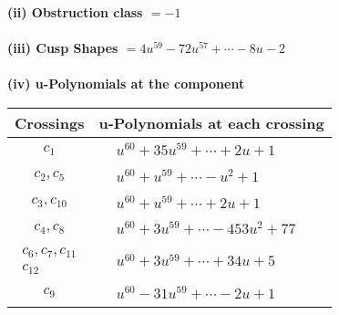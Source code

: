 \documentclass[1p]{elsarticle_modified}
\theoremstyle{definition}
\begin{document}
\flushleft \textbf{(ii) Obstruction class $= -1$}\\~\\
\flushleft \textbf{(iii) Cusp Shapes $= 4 u^{59}-72 u^{57}+\cdots-8 u-2$}\\~\\
\newpage\renewcommand{\arraystretch}{1}
\flushleft \textbf{(iv) u-Polynomials at the component}\newline \\
\begin{tabular}{m{50pt}|m{274pt}}
Crossings & \hspace{64pt}u-Polynomials at each crossing \\
\hline $$\begin{aligned}c_{1}\end{aligned}$$&$\begin{aligned}
&u^{60}+35 u^{59}+\cdots+2 u+1
\end{aligned}$\\
\hline $$\begin{aligned}c_{2},c_{5}\end{aligned}$$&$\begin{aligned}
&u^{60}+u^{59}+\cdots- u^2+1
\end{aligned}$\\
\hline $$\begin{aligned}c_{3},c_{10}\end{aligned}$$&$\begin{aligned}
&u^{60}+u^{59}+\cdots+2 u+1
\end{aligned}$\\
\hline $$\begin{aligned}c_{4},c_{8}\end{aligned}$$&$\begin{aligned}
&u^{60}+3 u^{59}+\cdots-453 u^2+77
\end{aligned}$\\
\hline $$\begin{aligned}c_{6},c_{7},c_{11}\\c_{12}\end{aligned}$$&$\begin{aligned}
&u^{60}+3 u^{59}+\cdots+34 u+5
\end{aligned}$\\
\hline $$\begin{aligned}c_{9}\end{aligned}$$&$\begin{aligned}
&u^{60}-31 u^{59}+\cdots-2 u+1
\end{aligned}$\\
\hline
\end{tabular}\\~\\
\end{document}
